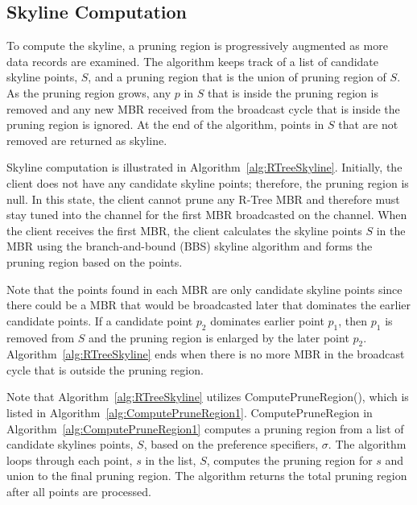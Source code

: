 \documentclass{sig-alternate}
\begin{document}
\subsection{Skyline Computation}

To compute the skyline, a pruning region is progressively augmented
as more data records are examined. The algorithm keeps track of a list
of candidate skyline points, $S$, and a pruning region that is the union of pruning
region of $S$. As the pruning region grows, any $p$ in $S$ that is inside the
pruning region is removed and any new MBR received from the broadcast
cycle that is inside the pruning region is ignored. At the end of the
algorithm, points in $S$ that are not removed are returned as
skyline.

Skyline computation is illustrated in Algorithm~\ref{alg:RTreeSkyline}.
Initially, the client does not have any candidate skyline points;
therefore, the pruning region is null. In this state, the client
cannot prune any R-Tree MBR and therefore must stay tuned into
the channel for the first MBR broadcasted on the channel.
When the client receives the first MBR, the client calculates the skyline
points $S$ in the MBR using the branch-and-bound (BBS) skyline algorithm
and forms the pruning region based on the points.

Note that the points found in each MBR are only candidate skyline points since
there could be a MBR that would be broadcasted later that dominates
the earlier candidate points. If a candidate point $p_2$ dominates
earlier point $p_1$, then $p_1$ is removed from $S$ and the pruning
region is enlarged by the later point $p_2$.
Algorithm~\ref{alg:RTreeSkyline} ends when there is no more MBR in
the broadcast cycle that is outside the pruning region.

Note that Algorithm~\ref{alg:RTreeSkyline} utilizes ComputePruneRegion(),
which is listed in Algorithm~\ref{alg:ComputePruneRegion1}.
ComputePruneRegion in Algorithm~\ref{alg:ComputePruneRegion1} computes
a pruning region from a list of candidate skylines points, $S$, based
on the preference specifiers, $\sigma$.
The algorithm loops through each point, $s$ in the list, $S$, computes
the pruning region for $s$ and union to the final pruning region. The
algorithm returns the total pruning region after all points are
processed.
\end{document}
